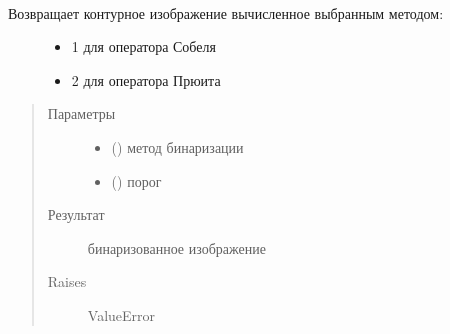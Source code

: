\documentclass[letterpaper,10pt,russian]{sphinxmanual}
\begin{document}
\begin{fulllineitems}
\begin{fulllineitems}
\end{fulllineitems}


\begin{fulllineitems}
\label{\detokenize{OCRImage:image.OCRImage.get_contoured_image}}~\begin{description}
\item[{Возвращает контурное изображение вычисленное выбранным методом:}] \leavevmode\begin{itemize}
\item {} 
1 \sphinxhyphen{} для оператора Собеля

\item {} 
2 \sphinxhyphen{} для оператора Прюита

\end{itemize}

\end{description}
\begin{quote}\begin{description}
\item[{Параметры}] \leavevmode\begin{itemize}
\item {} 
 () \textendash{} метод бинаризации

\item {} 
 () \textendash{} порог

\end{itemize}

\item[{Результат}] \leavevmode
{} \textendash{} бинаризованное изображение

\item[{Raises}] \leavevmode
ValueError

\end{description}\end{quote}

\end{fulllineitems}



\end{fulllineitems}
\end{document}

